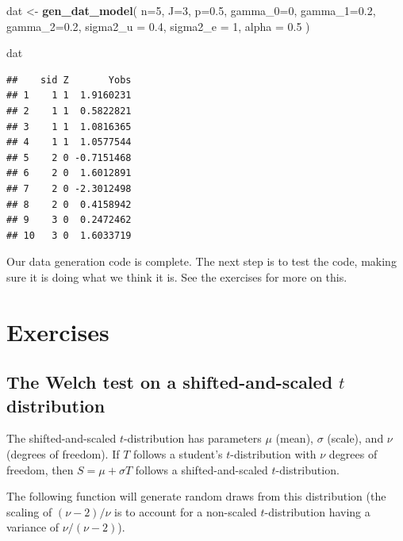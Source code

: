 \documentclass[
]{book}
\newenvironment{Shaded}{\begin{snugshade}}{\end{snugshade}}
\newcommand{\AttributeTok}[1]{\textcolor[rgb]{0.13,0.29,0.53}{#1}}
\newcommand{\DecValTok}[1]{\textcolor[rgb]{0.00,0.00,0.81}{#1}}
\newcommand{\FloatTok}[1]{\textcolor[rgb]{0.00,0.00,0.81}{#1}}
\newcommand{\FunctionTok}[1]{\textcolor[rgb]{0.13,0.29,0.53}{\textbf{#1}}}
\newcommand{\NormalTok}[1]{#1}
\newcommand{\OtherTok}[1]{\textcolor[rgb]{0.56,0.35,0.01}{#1}}
\begin{document}
\begin{Shaded}
\begin{Highlighting}[]
\NormalTok{dat }\OtherTok{\textless{}{-}} \FunctionTok{gen\_dat\_model}\NormalTok{( }\AttributeTok{n=}\DecValTok{5}\NormalTok{, }\AttributeTok{J=}\DecValTok{3}\NormalTok{, }\AttributeTok{p=}\FloatTok{0.5}\NormalTok{, }
                        \AttributeTok{gamma\_0=}\DecValTok{0}\NormalTok{, }\AttributeTok{gamma\_1=}\FloatTok{0.2}\NormalTok{, }\AttributeTok{gamma\_2=}\FloatTok{0.2}\NormalTok{,}
                        \AttributeTok{sigma2\_u =} \FloatTok{0.4}\NormalTok{, }\AttributeTok{sigma2\_e =} \DecValTok{1}\NormalTok{,}
                      \AttributeTok{alpha =} \FloatTok{0.5}\NormalTok{ )}

\NormalTok{dat}
\end{Highlighting}
\end{Shaded}

\begin{verbatim}
##    sid Z       Yobs
## 1    1 1  1.9160231
## 2    1 1  0.5822821
## 3    1 1  1.0816365
## 4    1 1  1.0577544
## 5    2 0 -0.7151468
## 6    2 0  1.6012891
## 7    2 0 -2.3012498
## 8    2 0  0.4158942
## 9    3 0  0.2472462
## 10   3 0  1.6033719
\end{verbatim}

Our data generation code is complete.
The next step is to test the code, making sure it is doing what we think it is.
See the exercises for more on this.

\section{Exercises}\label{exercises-2}

\subsection{\texorpdfstring{The Welch test on a shifted-and-scaled \(t\) distribution}{The Welch test on a shifted-and-scaled t distribution}}\label{ex_dgp}

The shifted-and-scaled \(t\)-distribution has parameters \(\mu\) (mean), \(\sigma\) (scale), and \(\nu\) (degrees of freedom).
If \(T\) follows a student's \(t\)-distribution with \(\nu\) degrees of freedom, then \(S = \mu + \sigma T\) follows a shifted-and-scaled \(t\)-distribution.

The following function will generate random draws from this distribution (the scaling of \((\nu-2)/\nu\) is to account for a non-scaled \(t\)-distribution having a variance of \(\nu/(\nu-2)\)).
\end{document}
